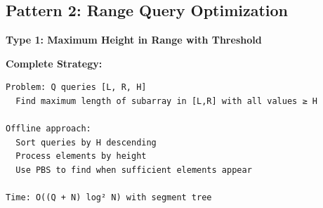 \documentclass[11pt,a4paper,oneside]{book}
\begin{document}
\subsection{Pattern 2: Range Query Optimization}

\begin{tcolorbox}[
    enhanced,breakable,
    colback=lightgray,
    colframe=accentorange,
    boxrule=2pt,
    arc=4mm,
    title=\textbf{Complete Range Query Algorithms}
]
\textbf{Type 1: Maximum Height in Range with Threshold}

\textbf{Complete Strategy:}
\begin{verbatim}
Problem: Q queries [L, R, H]
  Find maximum length of subarray in [L,R] with all values ≥ H
  
Offline approach:
  Sort queries by H descending
  Process elements by height
  Use PBS to find when sufficient elements appear

Time: O((Q + N) log² N) with segment tree
\end{verbatim}
\end{tcolorbox}
\end{document}
